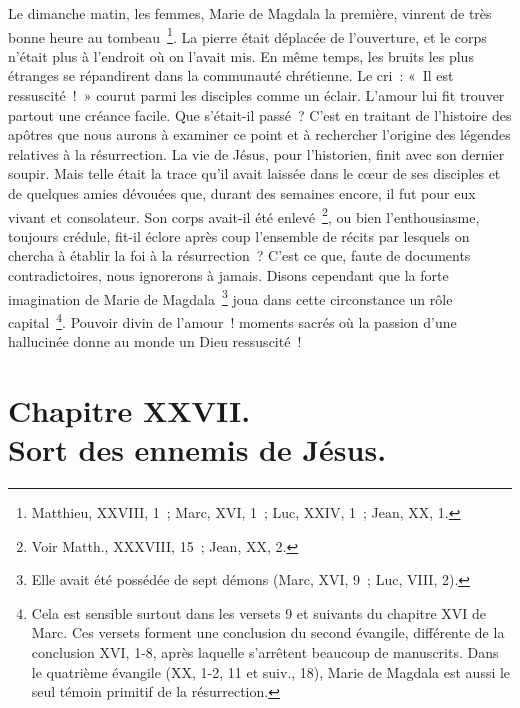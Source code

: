 \documentclass[french,twoside]{book} %
\newcommand\chapteropen{} %
\newcommand\chapterclose{} %
\begin{document}
Le dimanche matin, les femmes, Marie de Magdala la première, vinrent de très bonne heure au tombeau \footnote{Matthieu, XXVIII, 1 ; Marc, XVI, 1 ; Luc, XXIV, 1 ; Jean, XX, 1.}. La pierre était déplacée de l’ouverture, et le corps n’était plus à l’endroit où on l’avait mis. En même temps, les bruits les plus étranges se répandirent dans la communauté chrétienne. Le cri : « Il est ressuscité ! » courut parmi les disciples comme un éclair. L’amour lui fit trouver partout une créance facile. Que s’était-il passé ? C’est en traitant de l’histoire des apôtres que nous aurons à examiner ce point et à rechercher l’origine des légendes relatives à la résurrection. La vie de Jésus, pour l’historien, finit avec son dernier soupir. Mais telle était la trace qu’il avait laissée dans le cœur de ses disciples et de quelques amies dévouées que, durant des semaines encore, il fut pour eux vivant et consolateur. Son corps avait-il été enlevé \footnote{Voir Matth., XXXVIII, 15 ; Jean, XX, 2.}, ou bien l’enthousiasme, toujours crédule, fit-il éclore après coup l’ensemble de récits par lesquels on chercha à établir la foi à la résurrection ? C’est ce que, faute de documents contradictoires, nous ignorerons à jamais. Disons cependant que la forte imagination de Marie de Magdala \footnote{Elle avait été possédée de sept démons (Marc, XVI, 9 ; Luc, VIII, 2).} joua dans cette circonstance un rôle capital \footnote{Cela est sensible surtout dans les versets 9 et suivants du chapitre XVI de Marc. Ces versets forment une conclusion du second évangile, différente de la conclusion XVI, 1-8, après laquelle s’arrêtent beaucoup de manuscrits. Dans le quatrième évangile (XX, 1-2, 11 et suiv., 18), Marie de Magdala est aussi le seul témoin primitif de la résurrection.}. Pouvoir divin de l’amour ! moments sacrés où la passion d’une hallucinée donne au monde un Dieu ressuscité !
\chapterclose


\chapteropen
\chapter[{Chapitre XXVII. Sort des ennemis de Jésus.}]{Chapitre XXVII.\\
Sort des ennemis de Jésus.}\renewcommand{\leftmark}{Chapitre XXVII.\\
Sort des ennemis de Jésus.}
\end{document}
